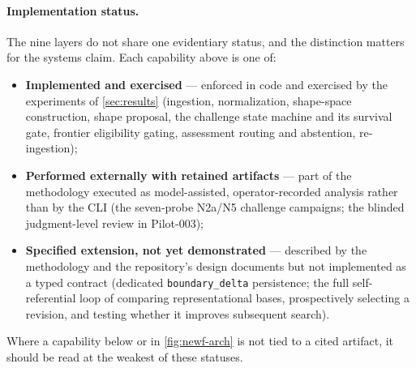 \documentclass[11pt]{article}
\theoremstyle{gowthm}
\theoremstyle{gowplain}
\begin{document}
\paragraph{Implementation status.}
The nine layers do not share one evidentiary status, and the distinction
matters for the systems claim. Each capability above is one of:
\begin{itemize}[nosep]
  \item \textbf{Implemented and exercised} --- enforced in code and exercised
    by the experiments of \cref{sec:results} (ingestion, normalization,
    shape-space construction, shape proposal, the challenge state machine and
    its survival gate, frontier eligibility gating, assessment routing and
    abstention, re-ingestion);
  \item \textbf{Performed externally with retained artifacts} --- part of the
    methodology executed as model-assisted, operator-recorded analysis rather
    than by the CLI (the seven-probe N2a/N5 challenge campaigns; the blinded
    judgment-level review in Pilot-003);
  \item \textbf{Specified extension, not yet demonstrated} --- described by
    the methodology and the repository's design documents but not implemented
    as a typed contract (dedicated \texttt{boundary\_delta} persistence; the
    full self-referential loop of comparing representational bases,
    prospectively selecting a revision, and testing whether it improves
    subsequent search).
\end{itemize}
Where a capability below or in \cref{fig:newf-arch} is not tied to a cited
artifact, it should be read at the weakest of these statuses.
\end{document}
